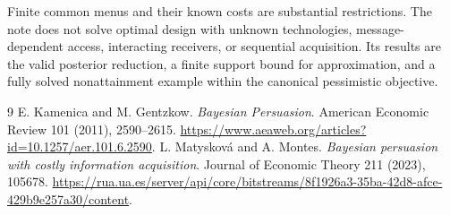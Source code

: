 \documentclass[11pt]{article}
\theoremstyle{definition}
\begin{document}
Finite common menus and their known costs are substantial restrictions.
The note does not solve optimal design with unknown technologies,
message-dependent access, interacting receivers, or sequential acquisition.
Its results are the valid posterior reduction, a finite support bound for
approximation, and a fully solved nonattainment example within the
canonical pessimistic objective.

\begin{thebibliography}{9}
 E. Kamenica and M. Gentzkow.
\emph{Bayesian Persuasion}. American Economic Review 101 (2011), 2590--2615.
\url{https://www.aeaweb.org/articles?id=10.1257/aer.101.6.2590}.
 L. Matyskov\'a and A. Montes.
\emph{Bayesian persuasion with costly information acquisition}.
Journal of Economic Theory 211 (2023), 105678.
\url{https://rua.ua.es/server/api/core/bitstreams/8f1926a3-35ba-42d8-afce-429b9e257a30/content}.
\end{thebibliography}
\end{document}
